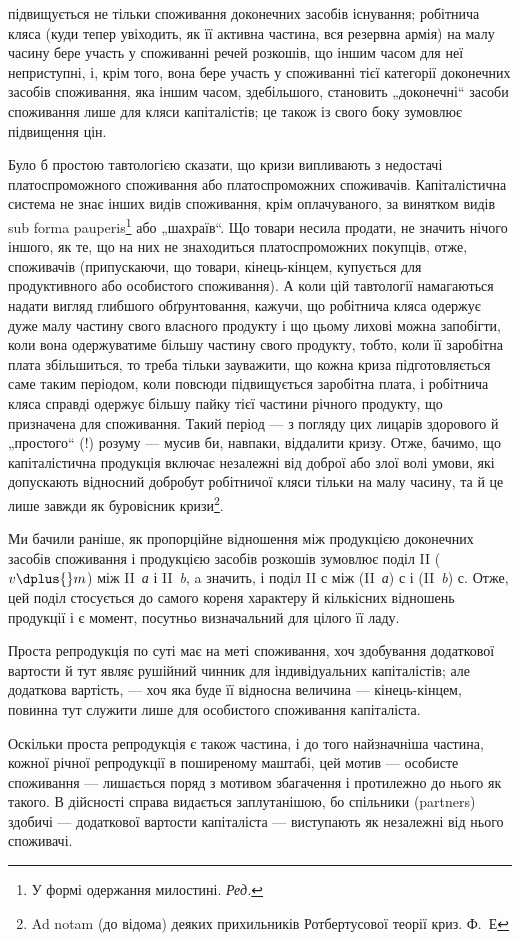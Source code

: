 \parcont{}  %
підвищується не тільки споживання доконечних засобів існування; робітнича
кляса (куди тепер увіходить, як її активна частина, вся резервна
армія) на малу часину бере участь у споживанні речей розкошів, що іншим
часом для неї неприступні, і, крім того, вона бере участь у споживанні
тієї категорії доконечних засобів споживання, яка іншим часом, здебільшого,
становить „доконечні“ засоби споживання лише для кляси капіталістів;
це також із свого боку зумовлює підвищення цін.

Було б простою тавтологією сказати, що кризи випливають з недостачі
платоспроможного споживання або платоспроможних споживачів.
Капіталістична система не знає інших видів споживання, крім оплачуваного,
за винятком видів sub forma pauperis\footnote*{
У формі одержання милостині. \emph{Ред.}
} або „шахраїв“. Що
товари несила продати, не значить нічого іншого, як те, що на них не
знаходиться платоспроможних покупців, отже, споживачів (припускаючи,
що товари, кінець-кінцем, купується для продуктивного або особистого
споживання). А коли цій тавтології намагаються надати вигляд
глибшого обґрунтовання, кажучи, що робітнича кляса одержує дуже малу
частину свого власного продукту і що цьому лихові можна запобігти,
коли вона одержуватиме більшу частину свого продукту, тобто, коли її
заробітна плата збільшиться, то треба тільки зауважити, що кожна криза
підготовляється саме таким періодом, коли повсюди підвищується заробітна
плата, і робітнича кляса справді одержує більшу пайку тієї частини
річного продукту, що призначена для споживання. Такий період — з погляду
цих лицарів здорового й „простого“ (!) розуму — мусив би, навпаки,
віддалити кризу. Отже, бачимо, що капіталістична продукція включає
незалежні від доброї або злої волі умови, які допускають відносний
добробут робітничої кляси тільки на малу часину, та й це лише завжди
як буровісник кризи\footnote{
Ad notam (до відома) деяких прихильників Ротбертусової теорії криз. Ф.~Е
}.

Ми бачили раніше, як пропорційне відношення між продукцією
доконечних засобів споживання і продукцією засобів розкошів зумовлює
поділ II ($v \dplus{} m$) між II~\emph{а} і II~\emph{b}, a значить, і поділ II с між (II~\emph{а}) с і (II~\emph{b}) с.
Отже, цей поділ стосується до самого кореня характеру й кількісних відношень
продукції і є момент, посутньо визначальний для цілого її ладу.

Проста репродукція по суті має на меті споживання, хоч здобування
додаткової вартости й тут являє рушійний чинник для індивідуальних
капіталістів; але додаткова вартість, — хоч яка буде її відносна величина —
кінець-кінцем, повинна тут служити лише для особистого споживання
капіталіста.

Оскільки проста репродукція є також частина, і до того найзначніша
частина, кожної річної репродукції в поширеному маштабі, цей мотив —
особисте споживання — лишається поряд з мотивом збагачення і протилежно
до нього як такого. В дійсності справа видається заплутанішою,
бо спільники (partners) здобичі — додаткової вартости капіталіста — виступають
як незалежні від нього споживачі.
